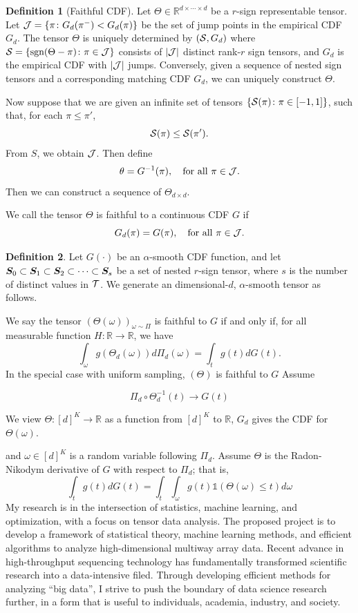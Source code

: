 \documentclass[10pt]{article}
\def\sign{\textup{sgn}}
\theoremstyle{definition}
\theoremstyle{definition}
\newtheorem{defn}{Definition}
\theoremstyle{definition}
\begin{document}
\begin{enumerate}
\begin{defn}[Faithful CDF] Let $\Theta\in\mathbb{R}^{d\times \cdots \times d}$ be a $r$-sign representable tensor. Let $\mathcal{J}=\{\pi\colon G_d(\pi^{-})<G_d(\pi)\}$ be the set of jump points in the empirical CDF $G_d$. The tensor $\Theta$ is uniquely determined by $(\mathcal{S}, G_d)$ where $\tS=\{\sign(\Theta-\pi)\colon \pi\in\tJ\}$ consists of $|\mathcal{J}|$ distinct rank-$r$ sign tensors, and $G_d$ is the empirical CDF with $|\mathcal{J}|$ jumps. Conversely, given a sequence of nested sign tensors and a corresponding matching CDF $G_d$, we can uniquely construct $\Theta$. 


Now suppose that we are given an infinite set of tensors $\{\mathcal{S}(\pi)\colon \pi\in[-1,1]\}$, such that, for each $\pi\leq \pi'$, 
\[
\mathcal{S}(\pi)\leq \mathcal{S}(\pi').
\]
From $S$, we obtain $\mathcal{J}$. Then define 
\[
\theta=G^{-1}(\pi), \quad \text{for all }\pi\in\mathcal{J}.
\]
Then we can construct a sequence of $\Theta_{d\times d}$. 



We call the tensor $\Theta$ is faithful to a continuous CDF $G$ if 
\[
G_d(\pi)=G(\pi),\quad \text{for all }\pi \in \mathcal{J}.
\]
\end{defn}

\begin{defn} Let $G(\cdot)$ be an $\alpha$-smooth CDF function, and let $\bm S_0\subset\bm S_1\subset\bm S_2\subset\cdots\subset \bm S_s$ be a set of nested $r$-sign tensor, where $s$ is the number of distinct values in $\mathcal{T}$. We generate an dimensional-$d$, $\alpha$-smooth tensor as follows.
\end{defn}


We say the tensor $(\Theta(\omega))_{\omega\sim \Pi}$ is faithful to $G$ if and only if, for all measurable function $H\colon\mathbb{R}\to\mathbb{R}$, we have
\[
\int_{\omega}g(\Theta_d(\omega))d\Pi_d(\omega)=\int_{t}g(t)dG(t).
\]
In the special case with uniform sampling, $(\Theta)$ is faithful to $G$
Assume

\[
 \Pi_d\circ \Theta_d^{-1}(t)\to G(t)
\]

We view $\Theta\colon [d]^K\to\mathbb{R}$ as a function from $[d]^K$ to $\mathbb{R}$, $G_d$ gives the CDF for $\Theta(\omega)$. 

and $\omega\in[d]^K$ is a random variable following $\Pi_d$. 
Assume $\Theta$ is the Radon-Nikodym derivative of $G$ with respect to $\Pi_d$; that is,
\[
\int_t g(t)dG(t)=\int_t \int_{\omega}g(t)\mathds{1}(\Theta(\omega)\leq t)d\omega 
\]
\vspace{.3cm}
My research is in the intersection of statistics, machine learning, and optimization, with a focus on tensor data analysis.
The proposed project is to develop a framework of statistical theory, machine learning methods, and efficient algorithms to analyze high-dimensional multiway array data. Recent advance in high-throughput sequencing technology has fundamentally transformed scientific research into a data-intensive filed. Through developing efficient methods for analyzing ``big data'', I strive to push the boundary of data science research further, in a form that is useful to individuals, academia, industry, and society. 


\end{enumerate}
\end{document}
